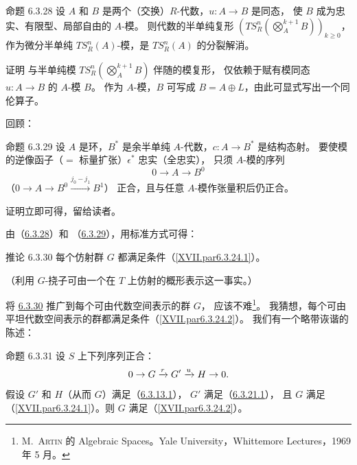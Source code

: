 \hypertarget{sga4.exp.XVII.proposition.6.3.28}{}\begin{enonce*}{命题 6.3.28}
设 $A$ 和 $B$ 是两个（交换）$R$-代数，$u:A\rightarrow B$ 是同态，
使 $B$ 成为忠实、有限型、局部自由的 $A$-模。
则代数的半单纯复形
$(TS^{n}_{R}(\bigotimes\limits^{k+1}_{A}B))_{k\geq 0}$，
作为微分半单纯 $TS^{n}_{R}(A)$-模，是 $TS^{n}_{R}(A)$ 的分裂解消。
\end{enonce*}

\begin{enonce*}[remark]{证明}
与半单纯模 $TS^{n}_{R}(\bigotimes\limits^{k+1}_{A}B)$ 伴随的模复形，
仅依赖于赋有模同态 $u:A\rightarrow B$ 的 $A$-模 $B$。
作为 $A$-模，$B$ 可写成 $B=A\oplus L$，由此可显式写出一个同伦算子。
\end{enonce*}

回顾：

\hypertarget{sga4.exp.XVII.proposition.6.3.29}{}\begin{enonce*}{命题 6.3.29}
设 $A$ 是环，$B^{\ast}$ 是余半单纯 $A$-代数，$c:A\rightarrow B^{\ast}$ 是结构态射。
要使模的逆像函子（$=$ 标量扩张）$\epsilon^{\ast}$ 忠实（\resp 全忠实），
只须 $A$-模的序列
$$
0\longrightarrow A\longrightarrow B^{0}
$$
（\resp\pageoriginale $0\rightarrow A\rightarrow B^{0}\xrightarrow{j_{0}-j_{1}}B^{1}$）
正合，且与任意 $A$-模作张量积后仍正合。
\end{enonce*}

证明立即可得，留给读者。

由（\hyperref[XVII.prop6.3.28]{6.3.28}）和
（\hyperref[XVII.prop6.3.29]{6.3.29}），用标准方式可得：

\hypertarget{sga4.exp.XVII.corollary.6.3.30}{}\begin{enonce*}{推论 6.3.30}
每个仿射群 $G$ 都满足条件（\ref{XVII.par6.3.24.1}）。
\end{enonce*}

（利用 $G$-挠子可由一个在 $T$ 上仿射的概形表示这一事实。）

将 \hyperref[XVII.cor6.3.30]{6.3.30} 推广到每个可由代数空间表示的群 $G$，
应该不难\footnote[1]{\label{XVII.noteArtin2}
M.~\textsc{Artin} 的 Algebraic Spaces。Yale University，Whittemore Lectures，1969 年 5 月。}。
我猜想，每个可由平坦代数空间表示的群都满足条件（\ref{XVII.par6.3.24.2}）。
我们有一个略带诙谐的陈述：

\hypertarget{sga4.exp.XVII.proposition.6.3.31}{}\begin{enonce*}{命题 6.3.31}
设 $S$ 上下列序列正合：
$$
0\rightarrow G\xrightarrow{r}G'\xrightarrow{u}H\rightarrow 0{}.
$$
假设 $G'$ 和 $H$（从而 $G$）满足（\hyperref[XVII.par6.3.13.1]{6.3.13.1}），
$G'$ 满足（\hyperref[XVII.par6.3.21.1]{6.3.21.1}），
且 $G$ 满足（\ref{XVII.par6.3.24.1}）。则 $G$ 满足（\ref{XVII.par6.3.24.2}）。
\end{enonce*}

